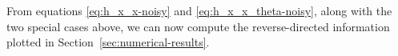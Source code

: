 \documentclass[letterpaper, 10pt, conference]{ieeeconf}
\begin{document}
From equations \eqref{eq:h_x_x-noisy} and \eqref{eq:h_x_x_theta-noisy}, along with the two special cases above, we can now compute the reverse-directed information plotted in Section~\ref{sec:numerical-results}.






%
%
%




\end{document}
